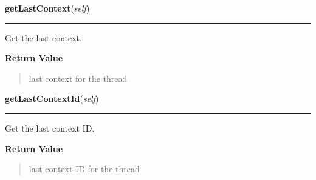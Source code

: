     \label{tracetool:TraceToSend:getLastContext}

    \vspace{0.5ex}

\hspace{.8\funcindent}\begin{boxedminipage}{\funcwidth}

    \raggedright \textbf{getLastContext}(\textit{self})

    \vspace{-1.5ex}

    \rule{\textwidth}{0.5\fboxrule}
\setlength{\parskip}{2ex}
    Get the last context.

\setlength{\parskip}{1ex}
      \textbf{Return Value}
    \vspace{-1ex}

      \begin{quote}
      last context for the thread

      \end{quote}

    \end{boxedminipage}

    \label{tracetool:TraceToSend:getLastContextId}

    \vspace{0.5ex}

\hspace{.8\funcindent}\begin{boxedminipage}{\funcwidth}

    \raggedright \textbf{getLastContextId}(\textit{self})

    \vspace{-1.5ex}

    \rule{\textwidth}{0.5\fboxrule}
\setlength{\parskip}{2ex}
    Get the last context ID.

\setlength{\parskip}{1ex}
      \textbf{Return Value}
    \vspace{-1ex}

      \begin{quote}
      last context ID for the thread

      \end{quote}

    \end{boxedminipage}

